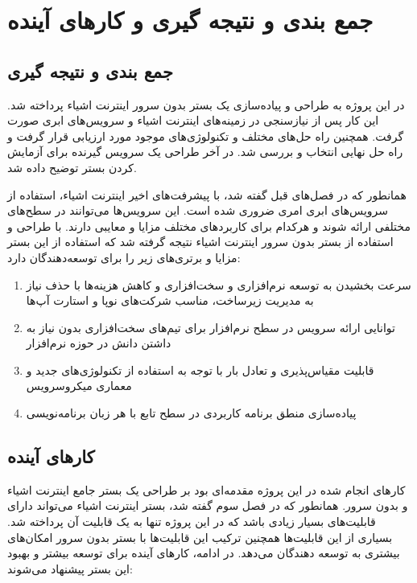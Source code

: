 \chapter{جمع بندی و نتیجه گیری و  کارهای آینده}\label{chapter5}

\section{جمع بندی و نتیجه گیری}

در این پروژه به طراحی و پیاده‌سازی یک بستر بدون سرور اینترنت اشیاء پرداخته شد. این کار پس از نیازسنجی در زمینه‌های اینترنت اشیاء و سرویس‌های ابری صورت گرفت. همچنین راه حل‌های مختلف و تکنولوژی‌های موجود مورد ارزیابی قرار گرفت و راه حل نهایی انتخاب و بررسی شد. در آخر طراحی یک سرویس گیرنده برای آزمایش کردن بستر توضیح داده شد.

همانطور که در فصل‌های قبل گفته شد، با پیشرفت‌های اخیر اینترنت اشیاء، استفاده از سرویس‌های ابری امری ضروری شده است. این سرویس‌ها می‌توانند در سطح‌های مختلفی ارائه شوند و هرکدام برای کاربردهای مختلف مزایا و معایبی دارند. با طراحی و استفاده از بستر بدون سرور اینترنت اشیاء نتیجه گرفته شد که استفاده از این بستر مزایا و برتری‌های زیر را برای توسعه‌دهندگان دارد: 

\begin{enumerate}
	
	\item سرعت بخشیدن به توسعه نرم‌افزاری و سخت‌افزاری و کاهش هزینه‌ها با حذف نیاز به مدیریت زیرساخت، مناسب شرکت‌های نوپا و استارت آپ‌ها
	
	\item توانایی ارائه‌ سرویس در سطح نرم‌افزار برای تیم‌های سخت‌افزاری بدون نیاز به داشتن دانش در حوزه نرم‌افزار
	
	\item قابلیت مقیاس‌پذیری و تعادل بار با توجه به استفاده از تکنولوژی‌های جدید و معماری میکروسرویس
	
	\item پیاده‌سازی منطق برنامه کاربردی در سطح تابع با هر زبان برنامه‌نویسی
	
\end{enumerate}

\newpage

\section{کارهای آینده}

کارهای انجام شده در این پروژه مقدمه‌ای بود بر طراحی یک بستر جامع اینترنت اشیاء و بدون سرور. همانطور که در فصل سوم گفته شد، بستر اینترنت اشیاء می‌تواند دارای قابلیت‌های بسیار زیادی باشد که در این پروژه تنها به یک قابلیت آن پرداخته شد. بسیاری از این قابلیت‌ها  همچنین ترکیب این قابلیت‌ها با بستر بدون سرور امکان‌های بیشتری به توسعه دهندگان می‌دهد. در ادامه، کارهای آینده برای توسعه بیشتر و بهبود این بستر پیشنهاد می‌شوند:

